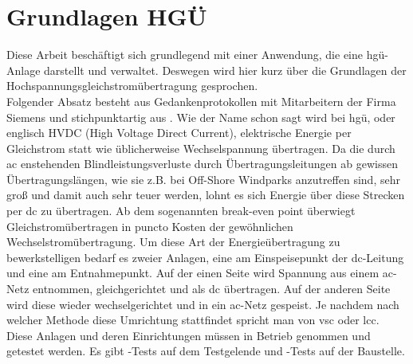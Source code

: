\section{Grundlagen HGÜ}
\label{sec:hgue}
Diese Arbeit beschäftigt sich grundlegend mit einer Anwendung, die eine \ac{hgü}-Anlage darstellt und verwaltet. Deswegen wird hier kurz über die Grundlagen der Hochspannungsgleichstromübertragung gesprochen.\\
Folgender Absatz besteht aus Gedankenprotokollen mit Mitarbeitern der Firma Siemens und stichpunktartig aus \cite[Kapitel 1-3]{11}.
Wie der Name schon sagt wird bei \ac{hgü}, oder englisch HVDC (High Voltage Direct Current), elektrische Energie per Gleichstrom statt wie üblicherweise Wechselspannung übertragen. Da die durch \ac{ac} enstehenden Blindleistungsverluste durch Übertragungsleitungen ab gewissen Übertragungslängen, wie sie z.B. bei Off-Shore Windparks anzutreffen sind, sehr groß und damit auch sehr teuer werden, lohnt es sich Energie über diese Strecken per \ac{dc} zu übertragen. Ab dem sogenannten break-even point überwiegt Gleichstromübertragen in puncto Kosten der gewöhnlichen Wechselstromübertragung. Um diese Art der Energieübertragung zu bewerkstelligen bedarf es zweier Anlagen, eine am Einspeisepunkt der \ac{dc}-Leitung und eine am Entnahmepunkt. Auf der einen Seite wird Spannung aus einem \ac{ac}-Netz entnommen, gleichgerichtet und als \ac{dc} übertragen. Auf der anderen Seite wird diese wieder wechselgerichtet und in ein \ac{ac}-Netz gespeist. Je nachdem nach welcher Methode diese Umrichtung stattfindet spricht man von \ac{vsc} oder \ac{lcc}. \\ Diese Anlagen und deren Einrichtungen müssen in Betrieb genommen und getestet werden. 
Es gibt -Tests auf dem Testgelende und -Tests auf der Baustelle.
